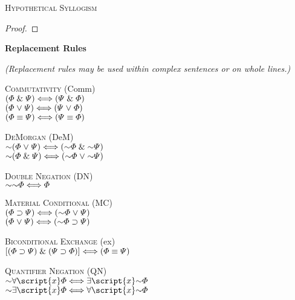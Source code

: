 \textsc{Hypothetical Syllogism}

\begin{proof}
\end{proof}

\newpage

{\large \bf Replacement Rules}

\begin{footnotesize}\emph{(Replacement rules may be used within complex sentences or on whole lines.)}\end{footnotesize}

\textsc{Commutativity} (Comm)\\
$(\varPhi{}\mathrel\&\varPsi{}) \Longleftrightarrow (\varPsi{}\mathrel\&\varPhi{})$\\
$(\varPhi{}\mkern1mu\vee\mkern1mu\varPsi{}) \Longleftrightarrow (\varPsi{}\mkern1mu\vee\mkern1mu\varPhi{})$\\
$(\varPhi{}\equiv\varPsi{}) \Longleftrightarrow (\varPsi{}\equiv\varPhi{})$

\textsc{DeMorgan} (DeM)\\
$\enot(\metaA{}\eor\metaB{}) \Longleftrightarrow (\enot\metaA{}\eand\enot\metaB{})$\\
$\enot(\metaA{}\eand\metaB{}) \Longleftrightarrow (\enot\metaA{}\eor\enot\metaB{})$

\textsc{Double Negation} (DN)\\
$\enot\enot\metaA{} \Longleftrightarrow \metaA{}$

\textsc{Material Conditional} (MC)\\
$(\metaA{}\eif\metaB{}) \Longleftrightarrow (\enot\metaA{}\eor\metaB{})$\\
$(\metaA{}\eor\metaB{}) \Longleftrightarrow (\enot\metaA{}\eif\metaB{})$

\textsc{Biconditional Exchange} ({\eiff}{ex})\\
$[(\varPhi{}\supset\varPsi{})\mathrel\&(\varPsi{}\supset\varPhi{})] \Longleftrightarrow (\varPhi{}\equiv\varPsi{})$

\textsc{Quantifier Negation} (QN)\\
$\enot\qt{\forall}{\script{x}}\metaA{} \Longleftrightarrow \qt{\exists}{\script{x}}\enot\metaA{}$\\
$\enot\qt{\exists}{\script{x}}\metaA{} \Longleftrightarrow \qt{\forall}{\script{x}}\enot\metaA{}$





